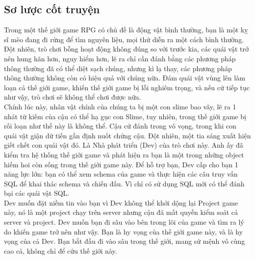 \subsection{Sơ lược cốt truyện}
\hspace*{0.5cm} Trong một thế giới game RPG có chủ đề là động vật bình thường, bạn là một kỵ sĩ mèo đang đi rừng để tìm nguyên liệu, mọi thứ diễn ra một cách bình thường. \\
\hspace*{0.5cm} Đột nhiên, trò chơi bỗng hoạt động không đúng so với trước kia, các quái vật trở nên hung hãn hơn, nguy hiểm hơn, lẽ ra chỉ cần đánh bằng các phương pháp thông thường đã có thể diệt sạch chúng, nhưng kì lạ thay, các phương pháp thông thường không còn có hiệu quả với chúng nữa. Đám quái vật vùng lên làm loạn cả thế giới game, khiến thế giới game bị lỗi nghiêm trọng, và nếu cứ tiếp tục như vậy, trò chơi sẽ không thể chơi được nữa.\\
\hspace*{0.5cm} Chính lúc này, nhân vật chính của chúng ta bị một con slime bao vây, lẽ ra 1 nhát từ kiếm của cậu có thể hạ gục con Slime, tuy nhiên, trong thế giới game bị rối loạn như thế này là không thể. Cậu cứ đánh trong vô vọng, trong khi con quái vật giận dữ tiến gần định nuốt chửng cậu. Đột nhiên, một tia sáng xuất hiện giết chết con quái vật đó. Là Nhà phát triển (Dev) của trò chơi này. Anh ấy đã kiểm tra hệ thống thế giới game và phát hiện ra bạn là một trong những object hiếm hoi còn sống trong thế giới game này. Để hỗ trợ bạn, Dev cấp cho bạn 1 năng lực lớn: bạn có thể xem schema của game và thực hiện các câu truy vấn SQL để khai thác schema và chiến đấu. Vì chỉ có sử dụng SQL mới có thể đánh bại các quái vật SQL. \\
\hspace*{0.5cm} Dev muốn đặt niềm tin vào bạn vì Dev không thể khởi dộng lại Project game này, nó là một project chạy trên server nhưng cậu đã mất quyền kiểm soát cả server và project. Dev muốn bạn đi sâu vào bên trong lõi của game và tìm ra lý do khiến game trở nên như vậy. Bạn là hy vọng của thế giới game này, và là hy vọng của cả Dev. Bạn bắt đầu đi vào sâu trong thế giới, mang sứ mệnh vô cùng cao cả, không chỉ để cứu thế giới này.

